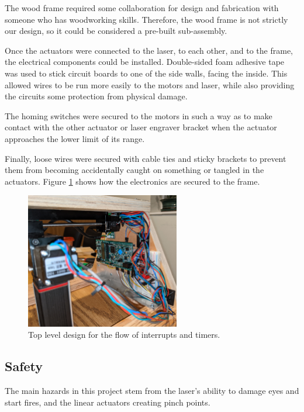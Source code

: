 \documentclass[11pt]{LaTeX-Classes/math-hw}
\begin{document}
The wood frame required some collaboration
for design and fabrication
with someone who has woodworking skills.
Therefore, the wood frame is not strictly our design,
so it could be considered a pre-built sub-assembly.

Once the actuators were connected to the laser, to each other, and to the frame,
the electrical components could be installed.
Double-sided foam adhesive tape was used to stick circuit boards
to one of the side walls, facing the inside.
This allowed wires to be run more easily to the motors and laser, while also
providing the circuits some protection from physical damage.

The homing switches were secured to the motors in such a way as to
make contact with the other actuator or laser engraver bracket when the actuator
approaches the lower limit of its range.

Finally, loose wires were secured with cable ties and sticky brackets
to prevent them from becoming accidentally caught on something or tangled in the actuators.
Figure \ref{fig:circuits-mechanical} shows how the electronics are secured to the frame.

\begin{figure}[H]
  \begin{center}
    \includegraphics[width=0.6\textwidth]{wiring-mechanical}
    \caption{Top level design for the flow of interrupts and timers.}
    \label{fig:circuits-mechanical}
  \end{center}
\end{figure}

\subsection{Safety}
The main hazards in this project stem from the laser's ability to damage eyes and start fires,
and the linear actuators creating pinch points.
\end{document}
